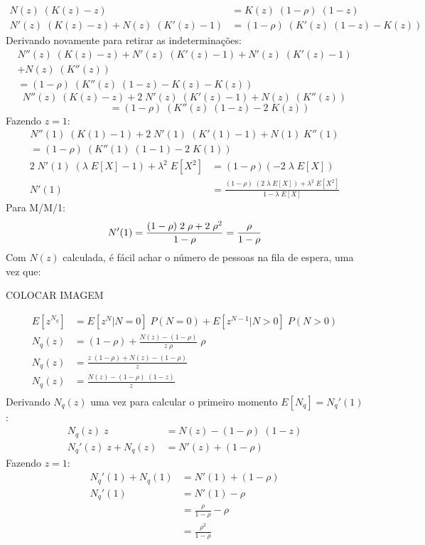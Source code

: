 \documentclass[a4paper]{article}
\newcommand{\E}[1]{E\!\left[#1\right]}
\begin{document}
\begin{align*}
    N(z) \; (K(z) - z) &= K(z) \; (1 - \rho) \; (1-z) \\
    N'(z) \; (K(z) - z) +  N(z) \; (K'(z) - 1)
        &= (1 - \rho) \; (K'(z) \; (1 - z) - K(z))
\end{align*}
Derivando novamente para retirar as indeterminações:
\begin{align*}
    N''(z) \; (K(z) - z) + N'(z) \; (K'(z) - 1)
        + N'(z) \; (K'(z) - 1) \\
        + N(z) \; (K''(z)) \\
    = (1 - \rho) \; (K''(z) \; (1 - z) - K(z) - K(z))
\end{align*}
\[
   N''(z) \; (K(z) - z) + 2 \; N'(z) \; (K'(z) - 1)
        + N(z) \; (K''(z))
\] \[
    \qquad\qquad \quad
    = (1 - \rho) \; (K''(z) \; (1 - z) - 2 \; K(z))
\]
Fazendo \(z = 1\):
\begin{align*}
    N''(1) \; (K(1) - 1) + 2 \; N'(1) \; (K'(1) - 1)
        + N(1) \; K''(1) \\
        = (1 - \rho) \; (K''(1) \; (1 - 1) - 2 \; K(1))
\end{align*} \begin{align*}
    2 \; N'(1) \; (\lambda \; \E{X} - 1)
        + \lambda^2 \; \E{X^2}
        &= (1 - \rho)(- 2 \; \lambda \; \E{X}) \\
    N'(1) &= \frac{(1 - \rho) \; (2 \; \lambda \; \E{X})
        + \lambda^2 \; \E{X^2}}{1 - \lambda \; \E{X}}
\end{align*}
Para M/M/1:
\[
    N'(1) = \frac{(1 - \rho) \; 2 \; \rho
        + 2 \; \rho^2}{1 - \rho} \\
        = \frac{\rho}{1 - \rho}
\]
Com \(N(z)\) calculada, é fácil achar
o número de pessoas na fila de espera,
uma vez que:
\begin{center}
    COLOCAR IMAGEM
\end{center}
\begin{align*}
    \E{z^{N_q}} &= \E{z^N| N = 0} \; P(N = 0)
        + \E{z^{N-1} | N > 0} \;P(N > 0) \\
    N_q(z) &= (1 - \rho) + \frac{N(z) - (1 - \rho)}{z \; \rho}
        \; \rho \\
    N_q(z) &= \frac{z \; (1 - \rho) + N(z) - (1 - \rho)}{z} \\
    N_q(z) &= \frac{N(z) - (1 - \rho) \; (1 - z)}{z} \\
\end{align*}
Derivando \(N_q(z)\) uma vez para calcular o primeiro momento
\(\E{N_q} = N_q'(1)\):
\begin{align*}
    N_q(z) \; z &= N(z) - (1 - \rho) \; (1 - z) \\
    N_q'(z) \; z + N_q(z) &= N'(z) + (1 - \rho)
\end{align*}
Fazendo \(z = 1\):
\begin{align*}
    N_q'(1) + N_q(1) &= N'(1) + (1 - \rho) \\
    N_q'(1) &= N'(1) - \rho \\
    &= \frac{\rho}{1 - \rho} - \rho \\
    &= \frac{\rho^2}{1 - \rho}
\end{align*}
\end{document}

